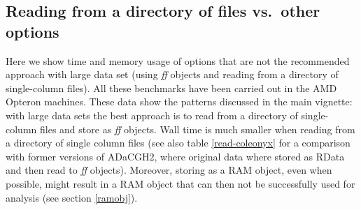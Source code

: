 \documentclass[a4paper,11pt]{article}
\begin{document}
\clearpage
\subsection{Reading from a directory of files vs.\ other options}

Here we show time and memory usage of options that are not the recommended
approach with large data set (using \textit{ff} objects and reading from a
directory of single-column files). All these benchmarks have been carried
out in the AMD Opteron machines. These data show the patterns discussed in
the main vignette: with large data sets the best approach is to read from
a directory of single-column files and store as \textit{ff} objects. Wall
time is much smaller when reading from a directory of single column files
(see also table \ref{read-coleonyx} for a comparison with former versions
of ADaCGH2, where original data where stored as RData and then read to
\textit{ff} objects). Moreover, storing as a RAM object, even when
possible, might result in a RAM object that can then not be successfully
used for analysis (see section \ref{ramobj}).


\renewcommand{\arraystretch}{1.8}
\end{document}
